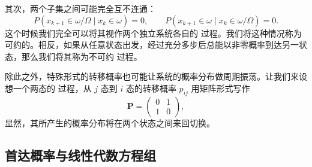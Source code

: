 其次，两个子集之间可能完全互不连通：
\begin{equation}
 P(x_{k+1}\in\omega/\Omega\mid x_k\in\omega)=0,\qquad
 P(x_{k+1}\in\omega\mid x_k\in\omega/\Omega)=0.
\tag{7.2.5}
\end{equation}
这个时候我们完全可以将其视作两个独立系统各自的  过程。我们将这种情况称为可约的。相反，如果从任意状态出发，经过充分多步后总能以非零概率到达另一状态，那么我们将其称为不可约  过程。

除此之外，特殊形式的转移概率也可能让系统的概率分布做周期振荡。让我们来设想一个两态的  过程，从 $j$ 态到 $i$ 态的转移概率 $p_{ij}$ 用矩阵形式写作
\begin{equation}
 \mathbf P=
 \begin{pmatrix}
 0&1\\
 1&0
 \end{pmatrix},
\tag{7.2.6}
\end{equation}
显然，其所产生的概率分布将在两个状态之间来回切换。

\subsection{首达概率与线性代数方程组}

